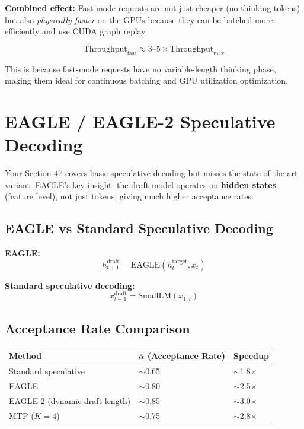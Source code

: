 \documentclass[11pt,a4paper]{article}
\begin{document}
\textbf{Combined effect:} Fast mode requests are not just cheaper (no thinking tokens) but also \textit{physically faster} on the GPUs because they can be batched more efficiently and use CUDA graph replay.

$$\text{Throughput}_{\text{fast}} \approx 3\text{--}5 \times \text{Throughput}_{\text{max}}$$

This is because fast-mode requests have no variable-length thinking phase, making them ideal for continuous batching and GPU utilization optimization.



\section{EAGLE / EAGLE-2 Speculative Decoding}

Your Section 47 covers basic speculative decoding but misses the state-of-the-art variant. EAGLE's key insight: the draft model operates on \textbf{hidden states} (feature level), not just tokens, giving much higher acceptance rates.

\subsection{EAGLE vs Standard Speculative Decoding}

\textbf{EAGLE:}
$$h_{t+1}^{\text{draft}} = \text{EAGLE}(h_t^{\text{target}}, x_t)$$

\textbf{Standard speculative decoding:}
$$x_{t+1}^{\text{draft}} = \text{SmallLM}(x_{1:t})$$

\subsection{Acceptance Rate Comparison}

\begin{center}
\begin{tabular}{lll}
\toprule
\textbf{Method} & \textbf{$\bar{\alpha}$ (Acceptance Rate)} & \textbf{Speedup} \\
\midrule
Standard speculative & $\sim$0.65 & $\sim$1.8$\times$ \\
EAGLE & $\sim$0.80 & $\sim$2.5$\times$ \\
EAGLE-2 (dynamic draft length) & $\sim$0.85 & $\sim$3.0$\times$ \\
MTP ($K = 4$) & $\sim$0.75 & $\sim$2.8$\times$ \\
\bottomrule
\end{tabular}
\end{center}
\end{document}
